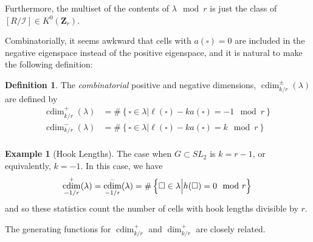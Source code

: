 \documentclass{amsart}[12pt]
\theoremstyle{definition}
\newtheorem{example}[dummy]{Example}
\newtheorem{definition}[dummy]{Definition}
\newcommand{\Z}{\mathbf{Z}}
\newcommand{\II}{\mathcal{I}}
\DeclareMathOperator{\cdim}{cdim}
\begin{document}
Furthermore, the multiset of the contents of $\lambda \mod r$ is just the class of $[R/\II]\in K^0(\Z_r)$.



Combinatorially, it seems awkward that cells with $a(\square)=0$ are included in the negative eigenspace instead of the positive eigenspace, and it is natural to make the following definition:
\begin{definition}
The \emph{combinatorial} positive and negative dimensions, $\cdim^\pm_{k/r}(\lambda)$ are defined by
\begin{align*}
\cdim^+_{k/r}(\lambda)&=\#\left\{\square\in\lambda \Big | \ell(\square)-k a(\square)=-1 \mod r\right\} \\
\cdim^-_{k/r}(\lambda)&=\#\left\{\square\in\lambda \Big | \ell(\square)-k a(\square)=k \mod r\right\} \\
\end{align*}
\end{definition}

\begin{example}[Hook Lengths]
The case when $G\subset SL_2$ is $k=r-1$, or equivalently, $k=-1$.  In this case, we have
$$\cdim^+_{-1/r}(\lambda)=\cdim^-_{-1/r}(\lambda)=\#\left\{\square\in\lambda \Big | h(\square)=0\mod r\right\} \\$$
and so these statistics count the number of cells with hook lengths divisible by $r$.
\end{example}

The generating functions for $\cdim^+_{k/r}$ and $\dim^+_{k/r}$ are closely related.
\end{document}
